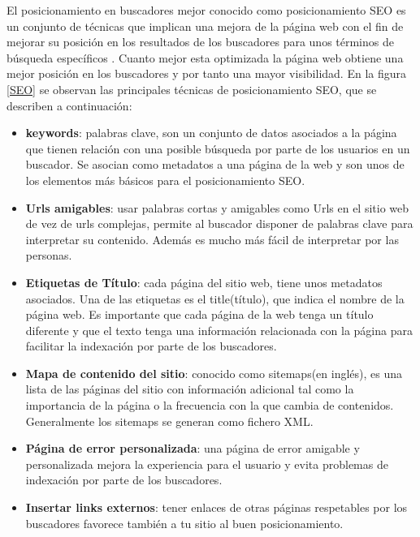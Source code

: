 El posicionamiento en buscadores mejor conocido como posicionamiento SEO es un conjunto de técnicas que implican una mejora de la página web con el fin de mejorar su posición en los resultados de los buscadores para unos términos de búsqueda específicos \cite{SEO}. Cuanto mejor esta optimizada la página web obtiene una mejor posición en los buscadores y por tanto una mayor visibilidad. En la figura \ref{SEO} se observan las principales técnicas de posicionamiento SEO, que se describen a continuación:

\begin{itemize}

\item \textbf{keywords}: palabras clave, son un conjunto de datos asociados a la página que tienen relación con una posible búsqueda por parte de los usuarios en un buscador. Se asocian como metadatos a una página de la web y son unos de los elementos más básicos para el posicionamiento SEO.

\item \textbf{Urls amigables}: usar palabras cortas y amigables como Urls en el sitio web de vez de urls complejas, permite al buscador disponer de palabras clave para interpretar su contenido. Además es mucho más fácil de interpretar por las personas.

\item \textbf{Etiquetas de Título}: cada página del sitio web, tiene unos metadatos asociados. Una de las etiquetas es el title(título), que indica el nombre de la página web. Es importante que cada página de la web tenga un título diferente y que el texto tenga una información relacionada con la página para facilitar la indexación por parte de los buscadores.

\item \textbf{Mapa de contenido del sitio}: conocido como sitemaps(en inglés), es una lista de las páginas del sitio con información adicional tal como la importancia de la página o la frecuencia con la que cambia de contenidos. Generalmente los sitemaps se generan como fichero XML.

\item \textbf{Página de error personalizada}: una página de error amigable y personalizada mejora la experiencia para el usuario y evita problemas de indexación por parte de los buscadores.

\item \textbf{Insertar links externos}: tener enlaces de otras páginas respetables por los buscadores favorece también a tu sitio al buen posicionamiento.


\end{itemize}
